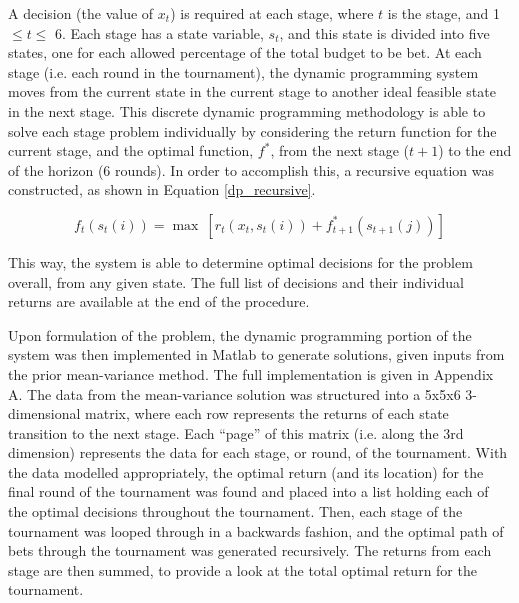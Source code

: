 \documentclass[12pt]{article}
\begin{document}
A decision (the value of $x_{t}$) is required at each stage, where $t$ is the stage, and 1 $\le t \le$ 6.
Each stage has a state variable, $s_{t}$, and this state is divided into five states, one for each allowed percentage of the total budget to be bet.
At each stage (i.e. each round in the tournament), the dynamic programming system moves from the current state in the current stage to another ideal feasible state in the next stage.
This discrete dynamic programming methodology is able to solve each stage problem individually by considering the return function for the current stage, and the optimal function, $f^{*}$, from the next stage ($t + 1$) to the end of the horizon (6 rounds).
In order to accomplish this, a recursive equation was constructed, as shown in Equation \ref{dp_recursive}.\cite{bellman1956dynamic}

\begin{equation}
f_{t}(s_{t}(i)) = \max \ [r_{t}(x_{t},s_{t}(i)) + f^{*}_{t+1}(s_{t+1}(j))]
\label{dp_recursive}
\end{equation}

This way, the system is able to determine optimal decisions for the problem overall, from any given state.
The full list of decisions and their individual returns are available at the end of the procedure.

Upon formulation of the problem, the dynamic programming portion of the system was then implemented in Matlab to generate solutions, given inputs from the prior mean-variance method.
The full implementation is given in Appendix A.
The data from the mean-variance solution was structured into a 5x5x6 3-dimensional matrix, where each row represents the returns of each state transition to the next stage.
Each ``page'' of this matrix (i.e. along the 3rd dimension) represents the data for each stage, or round, of the tournament.
With the data modelled appropriately, the optimal return (and its location) for the final round of the tournament was found and placed into a list holding each of the optimal decisions throughout the tournament.
Then, each stage of the tournament was looped through in a backwards fashion, and the optimal path of bets through the tournament was generated recursively.
The returns from each stage are then summed, to provide a look at the total optimal return for the tournament.
\end{document}
